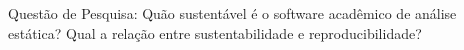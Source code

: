 %
%
%
%
%
%
%
%
%
%
%
%
%
%
%
%

Questão de Pesquisa: 
Quão sustentável é o software acadêmico de análise estática?
Qual a relação entre sustentabilidade e reproducibilidade?

